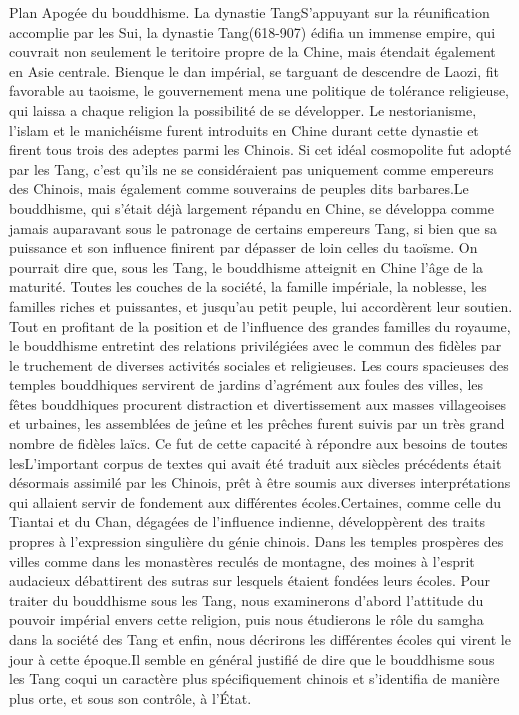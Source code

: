 Plan
Apogée du bouddhisme. La dynastie TangS'appuyant sur la réunification accomplie par les Sui, la dynastie Tang(618-907) édifia un immense empire, qui couvrait non seulement le teritoire propre de la Chine, mais étendait également en Asie centrale. Bienque le dan impérial, se targuant de descendre de Laozi, fit favorable au taoisme, le gouvernement mena une politique de tolérance religieuse, qui laissa a chaque religion la possibilité de se développer. Le nestorianisme, l'islam et le manichéisme furent introduits en Chine durant cette dynastie et firent tous trois des adeptes parmi les Chinois. Si cet idéal cosmopolite fut adopté par les Tang, c'est qu'ils ne se considéraient pas uniquement comme empereurs des Chinois, mais également comme souverains de peuples dits barbares.Le bouddhisme, qui s'était déjà largement répandu en Chine, se développa comme jamais auparavant sous le patronage de certains empereurs Tang, si bien que sa puissance et son influence finirent par dépasser de loin celles du taoïsme. On pourrait dire que, sous les Tang, le bouddhisme atteignit en Chine l'âge de la maturité. Toutes les couches de la société, la famille impériale, la noblesse, les familles riches et puissantes, et jusqu'au petit peuple, lui accordèrent leur soutien. Tout en profitant de la position et de l'influence des grandes familles du royaume, le bouddhisme entretint des relations privilégiées avec le commun des fidèles par le truchement de diverses activités sociales et religieuses. Les cours spacieuses des temples bouddhiques servirent de jardins d'agrément aux foules des villes, les fêtes bouddhiques procurent distraction et divertissement aux masses villageoises et urbaines, les assemblées de jeûne et les prêches furent suivis par un très grand nombre de fidèles laïcs. Ce fut de cette capacité à répondre aux besoins de toutes lesL'important corpus de textes qui avait été traduit aux siècles précédents était désormais assimilé par les Chinois, prêt à être soumis aux diverses interprétations qui allaient servir de fondement aux différentes écoles.Certaines, comme celle du Tiantai et du Chan, dégagées de l'influence indienne, développèrent des traits propres à l'expression singulière du génie chinois. Dans les temples prospères des villes comme dans les monastères reculés de montagne, des moines à l'esprit audacieux débattirent des sutras sur lesquels étaient fondées leurs écoles. Pour traiter du bouddhisme sous les Tang, nous examinerons d'abord l'attitude du pouvoir impérial envers cette religion, puis nous étudierons le rôle du samgha dans la société des Tang et enfin, nous décrirons les différentes écoles qui virent le jour à cette époque.Il semble en général justifié de dire que le bouddhisme sous les Tang coqui un caractère plus spécifiquement chinois et s'identifia de manière plus orte, et sous son contrôle, à l'État.



